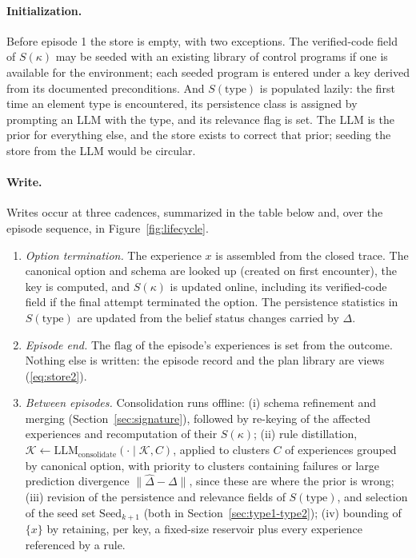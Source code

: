\documentclass[11pt]{article}
\newcommand{\llm}[1]{\mathrm{LLM}_{\mathrm{#1}}}
\newcommand{\calK}{\mathcal{K}}
\newcommand{\type}{\mathrm{type}}
\begin{document}
\paragraph{Initialization.}
Before episode 1 the store is empty, with two exceptions. The verified-code field of $S(\kappa)$ may be seeded with an existing library of control programs if one is available for the environment; each seeded program is entered under a key derived from its documented preconditions. And $S(\type)$ is populated lazily: the first time an element type is encountered, its persistence class is assigned by prompting an LLM with the type, and its relevance flag is set. The LLM is the prior for everything else, and the store exists to correct that prior; seeding the store from the LLM would be circular.

\paragraph{Write.}
Writes occur at three cadences, summarized in the table below and, over the episode sequence, in Figure~\ref{fig:lifecycle}.
\begin{enumerate}[leftmargin=1.5em,itemsep=1pt]
\item \emph{Option termination.} The experience $x$ is assembled from the closed trace. The canonical option and schema are looked up (created on first encounter), the key is computed, and $S(\kappa)$ is updated online, including its verified-code field if the final attempt terminated the option. The persistence statistics in $S(\type)$ are updated from the belief status changes carried by $\Delta$.
\item \emph{Episode end.} The $\mathrm{flag}$ of the episode's experiences is set from the outcome. Nothing else is written: the episode record and the plan library are views (\ref{eq:store2}).
\item \emph{Between episodes.} Consolidation runs offline: (i) schema refinement and merging (Section~\ref{sec:signature}), followed by re-keying of the affected experiences and recomputation of their $S(\kappa)$; (ii) rule distillation, $\calK\leftarrow\llm{consolidate}(\cdot\mid\calK,C)$, applied to clusters $C$ of experiences grouped by canonical option, with priority to clusters containing failures or large prediction divergence $\|\hat\Delta-\Delta\|$, since these are where the prior is wrong; (iii) revision of the persistence and relevance fields of $S(\type)$, and selection of the seed set $\mathrm{Seed}_{k+1}$ (both in Section~\ref{sec:type1-type2}); (iv) bounding of $\{x\}$ by retaining, per key, a fixed-size reservoir plus every experience referenced by a rule.
\end{enumerate}
\end{document}

